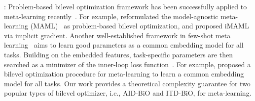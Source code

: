 \documentclass{osudissert96}
\begin{document}
\vspace{0.2cm}
: Problem-based bilevel optimization framework has been successfully applied to meta-learning recently~\cite{snell2017prototypical,franceschi2018bilevel,rajeswaran2019meta,zugner2019adversarial,ji2020convergence,ji2020multi}. For example, \cite{rajeswaran2019meta} reformulated the model-agnostic meta-learning (MAML)~\cite{finn2017model} as problem-based bilevel optimization, and proposed iMAML via implicit gradient. 
Another well-established framework in few-shot meta learning~\cite{bertinetto2018meta,lee2019meta,ravi2016optimization,snell2017prototypical,zhou2018deep} aims to learn good parameters as a common embedding model for all tasks. 
Building on the embedded features, task-specific parameters are then searched as a minimizer of the inner-loop loss function~\cite{bertinetto2018meta,lee2019meta}.
For example,
 \cite{snell2017prototypical}  proposed a bilevel optimization procedure for  meta-learning to learn a common embedding model  for all tasks. Our work provides a theoretical complexity guarantee for two popular types of bilevel optimizer, i.e., AID-BiO and ITD-BiO, for meta-learning. 
\end{document}
